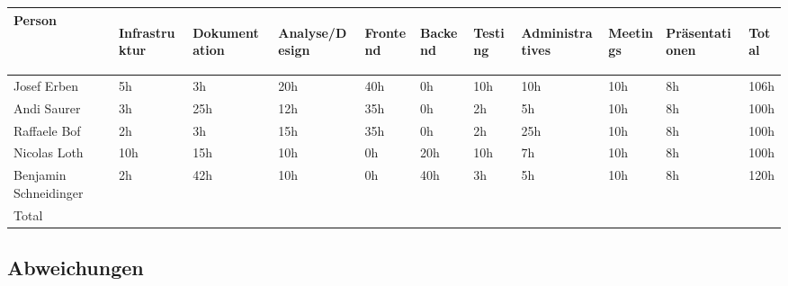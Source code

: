 \begin{longtabu} to \textwidth { | X[l] | l | l | l | l | l | l | l | l | l | l | }
\hline
\textbf{Person} & \begin{turn}{90}\textbf{Infrastruktur}\end{turn} & \begin{turn}{90}\textbf{Dokumentation}\end{turn} & \begin{turn}{90}\textbf{Analyse/Design}\end{turn} & \begin{turn}{90}\textbf{Frontend}\end{turn} & \begin{turn}{90}\textbf{Backend}\end{turn} & \begin{turn}{90}\textbf{Testing}\end{turn} & \begin{turn}{90}\textbf{Administratives}\end{turn} & \begin{turn}{90}\textbf{Meetings}\end{turn} & \begin{turn}{90}\textbf{Präsentationen}\end{turn} & \begin{turn}{90}\textbf{Total}\end{turn} \\\hline
\endhead

Josef Erben           & 5h & 3h  & 20h & 40h & 0h  & 10h & 10h & 10h & 8h & 106h\\\hline
Andi Saurer           & 3h & 25h & 12h & 35h & 0h  & 2h  & 5h  & 10h & 8h & 100h\\\hline
Raffaele Bof          & 2h & 3h  & 15h & 35h & 0h  & 2h  & 25h & 10h & 8h & 100h\\\hline
Nicolas Loth          & 10h & 15h & 10h & 0h & 20h & 10h & 7h & 10h & 8h & 100h    \\\hline
Benjamin Schneidinger & 2h & 42h & 10h & 0h  & 40h & 3h  & 5h  & 10h & 8h & 120h\\\hline
Total                 &    &     &     &     &     &     &     &     &    &     \\\hline
\end{longtabu}

\subsection{Abweichungen}\label{abweichungen}


